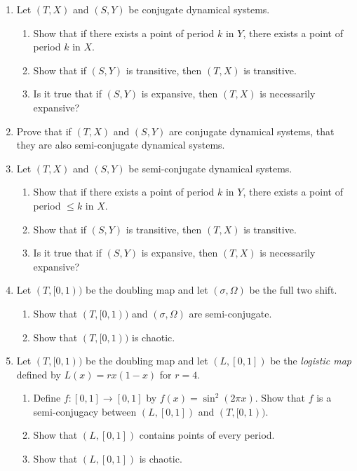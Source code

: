 \documentclass[letter]{article}
\begin{document}
\begin{enumerate}
		\begin{enumerate}
			\item Let $(T,X)$ and $(S,Y)$ be conjugate dynamical systems.
				\begin{enumerate}
					\item Show that if there exists a point of period $k$ in $Y$, there exists a point
						of period $k$ in $X$.
					\item Show that if $(S,Y)$ is transitive, then $(T,X)$ is transitive.
					\item Is it true that if $(S,Y)$ is expansive, then $(T,X)$ is necessarily expansive?
				\end{enumerate}
			\item Prove that if $(T,X)$ and $(S,Y)$ are conjugate dynamical systems, that they are also semi-conjugate dynamical
				systems.
			\item Let $(T,X)$ and $(S,Y)$ be semi-conjugate dynamical systems.
				\begin{enumerate}
					\item Show that if there exists a point of period $k$ in $Y$, there exists a point
						of period $\leq k$ in $X$.
					\item Show that if $(S,Y)$ is transitive, then $(T,X)$ is transitive.
					\item Is it true that if $(S,Y)$ is expansive, then $(T,X)$ is necessarily expansive?
				\end{enumerate}
			\item Let $(T,[0,1))$ be the doubling map and let $(\sigma, \Omega)$ be the full two shift.
				\begin{enumerate}
					\item Show that $(T,[0,1))$ and $(\sigma, \Omega)$ are semi-conjugate.
					\item Show that $(T,[0,1))$ is chaotic.
				\end{enumerate}
			\item Let $(T,[0,1))$ be the doubling map and let $(L,[0,1])$ be the \emph{logistic map} defined by
				$L(x)=rx(1-x)$ for $r=4$.
				\begin{enumerate}
					\item Define $f:[0,1]\to[0,1]$ by $f(x)=\sin^2(2\pi x)$. Show that $f$ is a semi-conjugacy
						between $(L,[0,1])$ and $(T,[0,1))$.
					\item Show that $(L,[0,1])$ contains points of every period.
					\item Show that $(L,[0,1])$ is chaotic.
				\end{enumerate}
		\end{enumerate}

	\end{enumerate}
\end{document}
